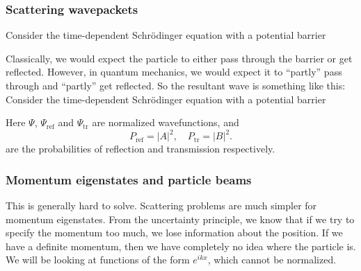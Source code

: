 \documentclass[a4paper]{article}
\begin{document}
\subsubsection*{Scattering wavepackets}
Consider the time-dependent Schr\"odinger equation with a potential barrier
\begin{center}
\end{center}
Classically, we would expect the particle to either pass through the barrier or get reflected. However, in quantum mechanics, we would expect it to ``partly'' pass through and ``partly'' get reflected. So the resultant wave is something like this:
Consider the time-dependent Schr\"odinger equation with a potential barrier
\begin{center}
\end{center}
Here $\Psi$, $\Psi_{\mathrm{ref}}$ and $\Psi_{\mathrm{tr}}$ are normalized wavefunctions, and
\[
  P_{\mathrm{ref}} = |A|^2,\quad P_{\mathrm{tr}} = |B|^2.
\]
are the probabilities of reflection and transmission respectively.

\subsubsection*{Momentum eigenstates and particle beams}
This is generally hard to solve. Scattering problems are much simpler for momentum eigenstates. From the uncertainty principle, we know that if we try to specify the momentum too much, we lose information about the position. If we have a definite momentum, then we have completely no idea where the particle is. We will be looking at functions of the form $e^{ikx}$, which cannot be normalized.
\end{document}
